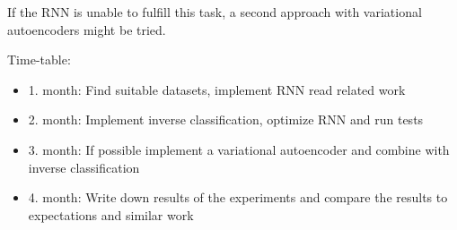 \documentclass[a4paper, 12pt, english , titlepage]{article}
\begin{document}
	If the RNN is unable to fulfill this task, a second approach with variational autoencoders might be tried. 
	
	
	
	
	
	
	\vspace{8pt}
	
	Time-table: 
	\vspace{-8pt}
	\begin{itemize}
		\item 1. month: Find suitable datasets, implement RNN read related work
		\item 2. month: Implement inverse classification, optimize RNN and run tests
		\item 3. month: If possible implement a variational autoencoder and combine with inverse classification
		\item 4. month: Write down results of the experiments and compare the results to expectations and similar work
	\end{itemize}
	
	
	
	
	
\end{document}
